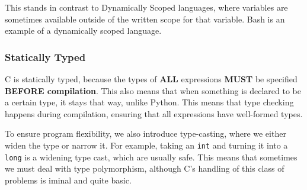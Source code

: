 This stands in contrast to Dynamically Scoped languages, where variables are sometimes available outside of the written scope for that variable.
Bash is an example of a dynamically scoped language.

\subsubsection{Statically Typed}\label{subsubsec:Statically_Typed}
C is statically typed, because the types of \textbf{ALL} expressions \textbf{MUST} be specified \textbf{BEFORE compilation}.
This also means that when something is declared to be a certain type, it stays that way, unlike Python.
This means that type checking happens during compilation, ensuring that all expressions have well-formed types.

To ensure program flexibility, we also introduce type-casting, where we either widen the type or narrow it.
For example, taking an \texttt{int} and turning it into a \texttt{long} is a widening type cast, which are usually safe.
This means that sometimes we must deal with type polymorphism, although C's handling of this class of problems is iminal and quite basic.


